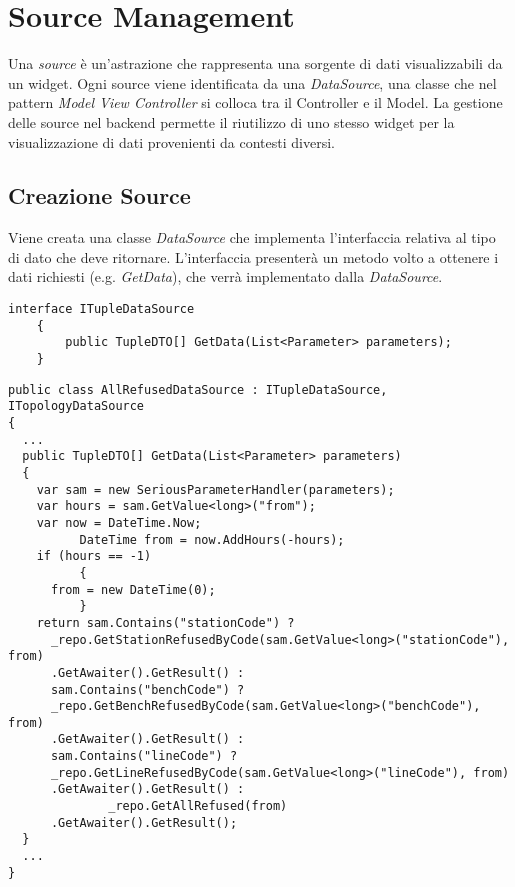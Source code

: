\section{Source Management}
\label{ch:sms}

Una \textit{source} è un'astrazione che rappresenta una sorgente di dati visualizzabili da un widget. Ogni source viene identificata da una \textit{DataSource}, una classe che nel pattern \textit{Model View Controller} si colloca tra il Controller e il Model. La gestione delle source nel backend permette il riutilizzo di uno stesso widget per la visualizzazione di dati provenienti da contesti diversi.

\subsection{Creazione Source}
\label{subsec:creazioneSource}
Viene creata una classe \textit{DataSource} che implementa l’interfaccia relativa al tipo di dato che deve ritornare. L'interfaccia presenterà un metodo volto a ottenere i dati richiesti (e.g. \textit{GetData}), che verrà implementato dalla \textit{DataSource}.
\begin{lstlisting}[caption={ITupleDataSource.cs}, style=sharpCode]
interface ITupleDataSource
    {
        public TupleDTO[] GetData(List<Parameter> parameters);
    }
\end{lstlisting}
\begin{lstlisting}[caption={AllRefusedDataSource.cs}, style=sharpCode]
public class AllRefusedDataSource : ITupleDataSource, ITopologyDataSource
{
  ...
  public TupleDTO[] GetData(List<Parameter> parameters)
  {
    var sam = new SeriousParameterHandler(parameters);
    var hours = sam.GetValue<long>("from");
    var now = DateTime.Now;
          DateTime from = now.AddHours(-hours);
    if (hours == -1)
          {
      from = new DateTime(0);
          }
    return sam.Contains("stationCode") ? 
      _repo.GetStationRefusedByCode(sam.GetValue<long>("stationCode"), from)
      .GetAwaiter().GetResult() :
      sam.Contains("benchCode") ? 
      _repo.GetBenchRefusedByCode(sam.GetValue<long>("benchCode"), from)
      .GetAwaiter().GetResult() :
      sam.Contains("lineCode") ?
      _repo.GetLineRefusedByCode(sam.GetValue<long>("lineCode"), from)
      .GetAwaiter().GetResult() :
              _repo.GetAllRefused(from)
      .GetAwaiter().GetResult();
  }
  ...
}
\end{lstlisting}

